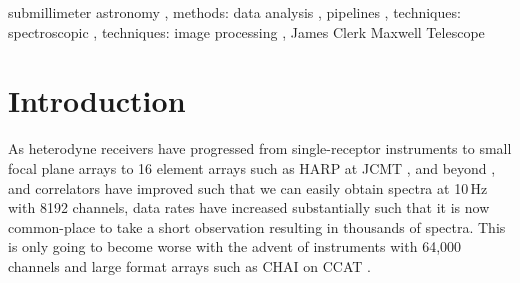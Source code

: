 \documentclass[final,authoryear,5p,times,twocolumn]{elsarticle}
\begin{document}
\begin{frontmatter}
\begin{abstract}
\end{abstract}

\begin{keyword}


submillimeter astronomy \sep
methods: data analysis \sep
pipelines \sep
techniques: spectroscopic \sep
techniques: image processing \sep
James Clerk Maxwell Telescope

\end{keyword}

\end{frontmatter}


\newcommand{\mnras}{Mon Not R Astron Soc}
\newcommand{\aap}{Astron Astrophys}
\newcommand{\pasp}{Pub Astron Soc Pacific}
\newcommand{\apj}{Astrophys J}
\newcommand{\qjras}{Quart J R Astron Soc}
\newcommand{\an}{Astron.\ Nach.}
\newcommand{\ijimw}{Int.\ J.\ Infrared \& Millimeter Waves}

\newcommand{\makecube}{\textsc{Makecube}}

\section{Introduction}
\label{sec:intro}

As heterodyne receivers have progressed from single-receptor
instruments
\citep{1992IJIMW..13.1487P,1992IJIMW..13..647D,1992IJIMW..13.1827C} to
small focal plane arrays
\citep{2003SPIE.4855..322G,2004A&A...423.1171S} to 16 element arrays
such as HARP at JCMT \citep{2009MNRAS.399.1026B}, and beyond
\citep{2007stt..conf..264G}, and correlators have improved such that
we can easily obtain spectra at 10\,Hz with 8192 channels, data rates
have increased substantially such that it is now common-place to take
a short observation resulting in thousands of spectra. This is only
going to become worse with the advent of instruments with 64,000
channels and large format arrays such as CHAI on CCAT
\citep{2009ASPC..417..113R}.
\end{document}
